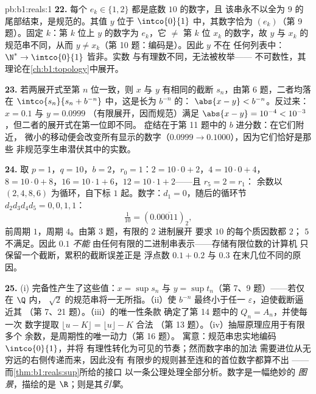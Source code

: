 \begin{solution}{pb:b1:reals:1}
\textbf{22.} 每个 $e_k \in \{1, 2\}$ 都是底数 $10$ 的数字，且
该串永不以全为 $9$ 的尾部结束，是规范的。其值 $y$ 位于
$\intco{0}{1}$ 中，其数字恰为 $(e_k)$（第 9 题）。固定
$k$：第 $k$ 位上 $y$ 的数字为 $e_k$，它 $\neq$ 第 $k$ 位
$x_k$ 的数字，故 $y$ 与 $x_k$ 的规范串不同，从而
$y \neq x_k$（第 10 题：编码是）。因此 $y$ 不在
任何列表中： $\N^* \to \intco{0}{1}$ 皆非。实数
与有理数不同，无法被枚举——
不可数性，其理论在\cref{ch:b1:topology}中展开。

\textbf{23.} 若两展开式至第 $n$ 位一致，则 $x$ 与 $y$
有相同的截断 $s_n$，由第 6 题，二者均落在
$\intco{s_n}{s_n + b^{-n}}$ 中，这是长为 $b^{-n}$ 的：
$\abs{x - y} < b^{-n}$。反过来：$x = 0.1$ 与 $y = 0.0999$
（有限展开，因而规范）满足 $\abs{x - y} = 10^{-4} <
10^{-3}$，但二者的展开式在第一位即不同。
症结在于第 11 题中的 $b$ 进分数：在它们附近，
微小的移动便会改变所有显示的数字（$0.0999 \to
0.1000$），因为它们恰好是那些
非规范孪生串潜伏其中的实数。

\textbf{24.} 取 $p = 1$，$q = 10$，$b = 2$，$r_0 = 1$：$2 = 10 \cdot
0 + 2$，$4 = 10 \cdot 0 + 4$，$8 = 10 \cdot 0 + 8$，$16 = 10
\cdot 1 + 6$，$12 = 10 \cdot 1 + 2$——且 $r_5 = 2 = r_1$：
余数以 $(2, 4, 8, 6)$ 为循环，自下标 $1$ 起。数字：$d_1 =
0$，随后的循环节 $d_2 d_3 d_4 d_5 = 0, 0, 1, 1$：
\[
\tfrac{1}{10} = (0.0\overline{0011})_2 ,
\]
前周期 $1$，周期 $4$。由第 3 题，有限的 $2$ 进制展开
要求 $10$ 的每个质因数都 $2$；
$5$ 不满足。因此 $0.1$ \emph{不能}
由任何有限的二进制串表示——存储有限位数的计算机
只保留一个截断，累积的截断误差正是
浮点数 $0.1 + 0.2$ 与 $0.3$ 在末几位不同的原因。

\textbf{25.} (i) 完备性产生了这些值：$x = \sup s_n$
与 $y = \sup t_n$（第 7、9 题）——若仅在 $\Q$ 内，
$\sqrt 2$ 的规范串将一无所指。（ii）使
$b^{-n}$ 最终小于任一
$\varepsilon$，迫使截断逼近其
（第 7、21 题）。（iii）的唯一性条款
确定了第 14 题中的 $Q_n = A_n$，并使每一次
数字提取 $\lfloor u - K \rfloor = \lfloor u \rfloor - K$ 合法
（第 13 题）。（iv）抽屉原理应用于有限多个
余数，是周期性的唯一动力（第 16 题）。
寓意：规范串忠实地编码 $\intco{0}{1}$，并将
有理性转化为可见的节奏；然而数字串的加法
需要进位从无穷远的右侧传递而来，因此没有
有限步的规则甚至连和的首位数字都算不出 ——
而\cref{thm:b1:reals:sup}所给的接口
以一条公理处理全部分析。数字是一幅绝妙的
\emph{图景}，描绘的是 $\R$；则是其\emph{引擎}。
\end{solution}
